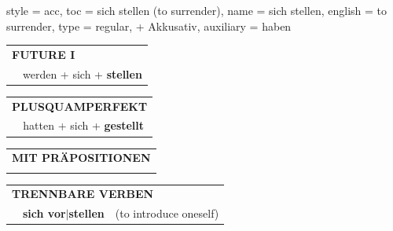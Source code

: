 \begin{verbentry}{
  style = {acc},
  toc = {sich stellen (to surrender)},
  name = {sich stellen},
  english = {to surrender},
  type = {regular, + Akkusativ},
  auxiliary = {haben}
}
\begin{tabular}{rl}
    \multicolumn{2}{l}{\textbf{FUTURE I} }\\
    &werden + sich + \textbf{stellen}\\
 
  \end{tabular}
\hfill
   \begin{tabular}{rl}
      \multicolumn{2}{l}{\textbf{PLUSQUAMPERFEKT}}\\
    &hatten + sich + \textbf{gestellt}\\
  \end{tabular}
  
\vspace{10pt}

   \begin{tabular}{lll}
      \multicolumn{3}{l}{\textbf{MIT PRÄPOSITIONEN}}\\
\vspace{0pt}
  \end{tabular}
  \hfill
   \begin{tabular}{lll}
      \multicolumn{3}{l}{\textbf{TRENNBARE VERBEN}}\\
& \textbf{sich vor$|$stellen} & (to introduce oneself)
  \end{tabular}
  
  \vspace{-5pt}
\end{verbentry}


